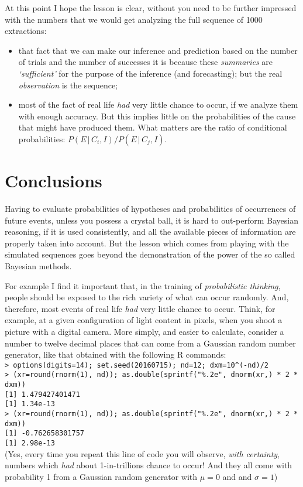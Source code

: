 \documentclass[11pt]{article}
\begin{document}
At this point I hope the lesson is clear, without you need  to be further
impressed with the numbers that we would get analyzing the full sequence 
of 1000 extractions:
\begin{itemize}
\item that fact that we can make our inference and prediction based on the 
      number of trials and the number of successes it is because 
      these {\em summaries} are {\em `sufficient'} 
      for the purpose of the inference (and forecasting);
      but the real {\em observation}
      is the sequence;
\item most of the fact of real life {\em had} very little chance to occur,
      if we analyze them with enough accuracy. But this implies little on the 
      probabilities of the cause that might have produced them. 
      What matters are the ratio of conditional probabilities:
      $P(E\,|\,C_i,I)/P(E\,|\,C_j,I)$.
\end{itemize}

\section{Conclusions}
Having to evaluate probabilities of hypotheses
and probabilities of occurrences of future events,
unless you possess a crystal ball, 
it is hard to out-perform Bayesian reasoning,
if it is used consistently, and all the available
pieces of information are properly taken into account.
But the lesson which comes from playing with the simulated
sequences goes beyond the demonstration of the power of the so called
Bayesian methods.

For example
I find it important that, in the
training of {\em probabilistic thinking},
people should be exposed to the rich 
variety of what can occur 
randomly. And, therefore, most events
of real life {\em had} very little chance
to occur. Think, for example, at a given configuration 
of light content in pixels, when 
you shoot a picture with a digital camera. More simply,
and easier to calculate, consider a number to twelve decimal places
that can come from a Gaussian random number generator, 
like that obtained with the following R commands:\\
{\small 
\verb|> options(digits=14); set.seed(20160715); nd=12; dxm=10^(-nd)/2|\\
\verb|> (xr=round(rnorm(1), nd)); as.double(sprintf("%.2e", dnorm(xr,) * 2 * dxm))|\\
\verb|[1] 1.479427401471|\\
\verb|[1] 1.34e-13|\\
\verb|> (xr=round(rnorm(1), nd)); as.double(sprintf("%.2e", dnorm(xr,) * 2 * dxm))|\\
\verb|[1] -0.762658301757|\\
\verb|[1] 2.98e-13|
}\\
(Yes, every time you repeat this line of code you will observe, 
{\em with certainty}, numbers which {\em had} about 1-in-trillions
chance to occur! And they all come with probability 1
from a Gaussian random generator with $\mu=0$ and and $\sigma=1$)
\end{document}
